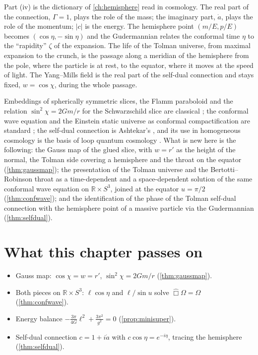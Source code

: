 Part (iv) is the dictionary of \cref{ch:hemisphere} read in cosmology. The real part of the connection, $\Gamma=1$, plays the role of the mass; the imaginary part, $\dot a$, plays the role of the momentum; $|c|$ is the energy. The hemisphere point $(m/E,p/E)$ becomes $(\cos\eta,-\sin\eta)$ and the Gudermannian relates the conformal time $\eta$ to the ``rapidity'' $\zeta$ of the expansion. The life of the Tolman universe, from maximal expansion to the crunch, is the passage along a meridian of the hemisphere from the pole, where the particle is at rest, to the equator, where it moves at the speed of light. The Yang--Mills field is the real part of the self-dual connection and stays fixed, $w=\cos\chi$, during the whole passage.

\begin{litbox}
Embeddings of spherically symmetric slices, the Flamm paraboloid and the relation $\sin^2\chi=2Gm/r$ for the Schwarzschild slice are classical \cite{MTW}; the conformal wave equation and the Einstein static universe as conformal compactification are standard \cite{HawkingEllis,PenroseRindler1}; the self-dual connection is Ashtekar's \cite{Ashtekar1986}, and its use in homogeneous cosmology is the basis of loop quantum cosmology \cite{AshtekarPawlowskiSingh2006}. What is new here is the following: the Gauss map of the glued slice, with $w=r'$ as the height of the normal, the Tolman side covering a hemisphere and the throat on the equator (\cref{thm:gaussmap}); the presentation of the Tolman universe and the Bertotti--Robinson throat as a time-dependent and a space-dependent solution of the same conformal wave equation on $\mathbb R\times S^3$, joined at the equator $u=\pi/2$ (\cref{thm:confwave}); and the identification of the phase of the Tolman self-dual connection with the hemisphere point of a massive particle via the Gudermannian (\cref{thm:selfdual}).
\end{litbox}

\section*{What this chapter passes on}
\begin{itemize}[nosep]
\item Gauss map: $\cos\chi=w=r'$, $\sin^2\chi=2Gm/r$ (\cref{thm:gaussmap}).
\item Both pieces on $\mathbb R\times S^3$: $\ell\cos\eta$ and $\ell/\sin u$ solve $\hat\Box\Omega=\Omega$ (\cref{thm:confwave}).
\item Energy balance $-\frac{3\pi}{4G}\ell^2+\frac{3\pi^2}{g^2}=0$ (\cref{prop:minisuper}).
\item Self-dual connection $c=1+i\dot a$ with $c\cos\eta=e^{-i\eta}$, tracing the hemisphere (\cref{thm:selfdual}).
\end{itemize}

